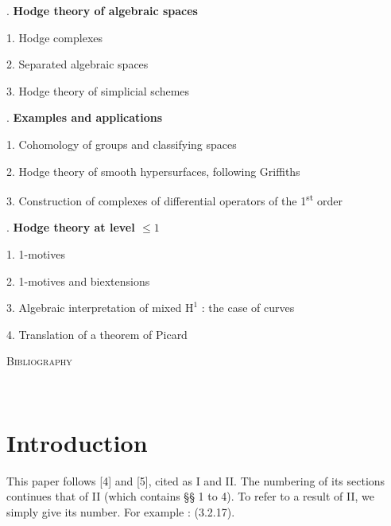 \documentclass[11pt,leqno]{article}
\newcommand{\Page}[1]{\ifvmode\noindent\else\unskip\ \fi{\footnotesize\textcolor{gray}{[p.\,#1]}}\ \ignorespaces}
\begin{document}
\medskip
{}. \textbf{Hodge theory of algebraic spaces}\par
\noindent\hspace*{1.5em}1. Hodge complexes\par
\noindent\hspace*{1.5em}2. Separated algebraic spaces\par
\noindent\hspace*{1.5em}3. Hodge theory of simplicial schemes\par
\medskip
{}. \textbf{Examples and applications}\par
\noindent\hspace*{1.5em}1. Cohomology of groups and classifying spaces\par
\noindent\hspace*{1.5em}2. Hodge theory of smooth hypersurfaces, following Griffiths\par
\noindent\hspace*{1.5em}3. Construction of complexes of differential operators of the 1\textsuperscript{st} order\par
\medskip
{}. \textbf{\boldmath Hodge theory at level \(\leq 1\)}\par
\noindent\hspace*{1.5em}1. 1-motives\par
\noindent\hspace*{1.5em}2. 1-motives and biextensions\par
\noindent\hspace*{1.5em}3. Algebraic interpretation of mixed \(\mathrm{H}^{1}\) : the case of curves\par
\noindent\hspace*{1.5em}4. Translation of a theorem of Picard\par
\medskip
\noindent\textsc{Bibliography}\par
\endgroup

\Page{6}

\section*{\centering Introduction}

This paper follows [4] and [5], cited as I and II. The numbering of its sections continues that of II (which contains §§ 1 to 4). To refer to a result of II, we simply give its number. For example : (3.2.17).
\end{document}
